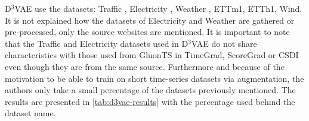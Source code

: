 D$^3$VAE use the datasets: Traffic \cite{cuturi_pems-sf_2011}, Electricity \cite{trindade_electricityloaddiagrams20112014_2015}, Weather \cite{max-planck-institut_fuer_biogeochemie_weather_2008}, ETTm1\cite{zhou_informer_2021}, ETTh1\cite{zhou_informer_2021}, Wind\cite{li_generative_2022}. It is not explained how the datasets of Electricity  \cite{trindade_electricityloaddiagrams20112014_2015} and Weather \cite{max-planck-institut_fuer_biogeochemie_weather_2008} are gathered or pre-processed, only the source websites are mentioned. It is important to note that the Traffic and Electricity datasets used in D$^3$VAE do not share characteristics with those used from GluonTS in TimeGrad, ScoreGrad or CSDI even though they are from the same source. Furthermore and because of the motivation to be able to train on short time-series datasets via augmentation, the authors only take a small percentage of the datasets previously mentioned. The results are presented in \autoref{tab:d3vae-results} with the percentage used behind the dataset name.

